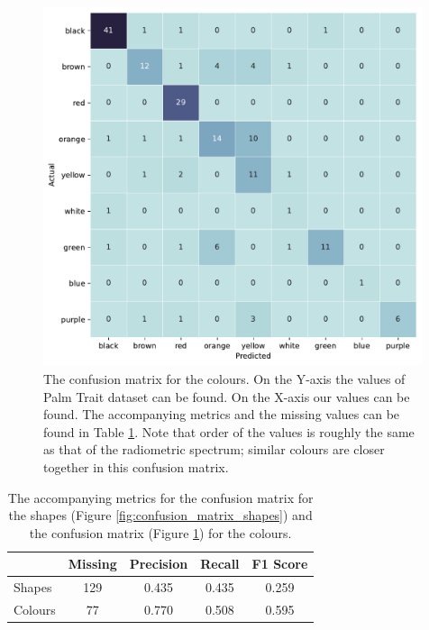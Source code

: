 \documentclass[a4paper, 12pt, oneside]{book} %
\begin{document}
\begin{figure}[htpb]
    \centering
    \includegraphics[width=0.99\textwidth]{figures/confusion_matrix_colours.pdf}
    \caption[Confusion matrix colours]{The confusion matrix for the colours. On the Y-axis the values of Palm Trait dataset can be found. On the X-axis our values can be found. The accompanying metrics and the missing values can be found in Table \ref{tab:confusion_matrix_metric_table}. Note that order of the values is roughly the same as that of the radiometric spectrum; similar colours are closer together in this confusion matrix.}
    \label{fig:confusion_matrix_colours}
\end{figure}

\begin{table}[htpb]
    \centering
    \caption[Accompanying metric for confusion matrices]{The accompanying metrics for the confusion matrix for the shapes (Figure \ref{fig:confusion_matrix_shapes}) and the confusion matrix (Figure \ref{fig:confusion_matrix_colours}) for the colours.}
    \label{tab:confusion_matrix_metric_table}
    \begin{tabular}{@{}lcccc@{}}
    \cmidrule(l){2-5}
            & \multicolumn{1}{l}{\textbf{Missing}} & \multicolumn{1}{l}{\textbf{Precision}} & \multicolumn{1}{l}{\textbf{Recall}} & \multicolumn{1}{l}{\textbf{F1 Score}} \\ \midrule
    Shapes  & 129                                  & 0.435                                  & 0.435                               & 0.259                                 \\ \midrule
    Colours & 77                                   & 0.770                                  & 0.508                               & 0.595                                 \\ \bottomrule
    \end{tabular}
\end{table}
\end{document}

